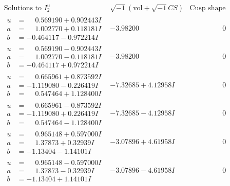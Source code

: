 \documentclass[1p]{elsarticle_modified}
\theoremstyle{definition}
\newcommand{\I}{\sqrt{-1}}
\begin{document}
$$\begin{array}{c|c|c}  
\text{Solutions to }I^u_{2}& \I (\text{vol} + \sqrt{-1}CS) & \text{Cusp shape}\\
 \hline 
\begin{aligned}
u &= \phantom{-}0.569190 + 0.902443 I \\
a &= \phantom{-}1.002770 + 0.118181 I \\
b &= -0.464117 - 0.972214 I\end{aligned}
 & -3.98200\phantom{ +0.000000I} & \phantom{-0.000000 } 0 \\ \hline\begin{aligned}
u &= \phantom{-}0.569190 - 0.902443 I \\
a &= \phantom{-}1.002770 - 0.118181 I \\
b &= -0.464117 + 0.972214 I\end{aligned}
 & -3.98200\phantom{ +0.000000I} & \phantom{-0.000000 } 0 \\ \hline\begin{aligned}
u &= \phantom{-}0.665961 + 0.873592 I \\
a &= -1.119080 - 0.226419 I \\
b &= \phantom{-}0.547464 + 1.128400 I\end{aligned}
 & -7.32685 + 4.12958 I & \phantom{-0.000000 } 0 \\ \hline\begin{aligned}
u &= \phantom{-}0.665961 - 0.873592 I \\
a &= -1.119080 + 0.226419 I \\
b &= \phantom{-}0.547464 - 1.128400 I\end{aligned}
 & -7.32685 - 4.12958 I & \phantom{-0.000000 } 0 \\ \hline\begin{aligned}
u &= \phantom{-}0.965148 + 0.597000 I \\
a &= \phantom{-}1.37873 + 0.32939 I \\
b &= -1.13404 - 1.14101 I\end{aligned}
 & -3.07896 + 4.61958 I & \phantom{-0.000000 } 0 \\ \hline\begin{aligned}
u &= \phantom{-}0.965148 - 0.597000 I \\
a &= \phantom{-}1.37873 - 0.32939 I \\
b &= -1.13404 + 1.14101 I\end{aligned}
 & -3.07896 - 4.61958 I & \phantom{-0.000000 } 0 \\ \hline\begin{aligned}

\end{aligned}
\end{array}$$
\end{document}
